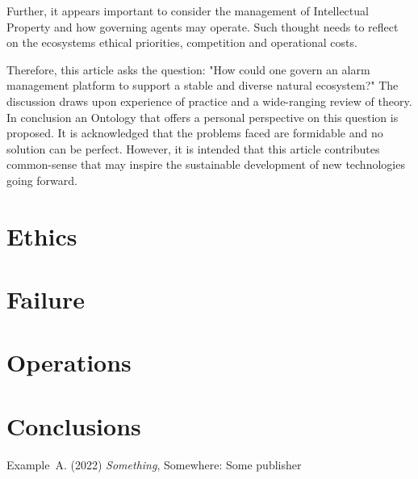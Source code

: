 \documentclass[11pt, oneside]{article}   	%
\begin{document}
Further, it appears important to consider the management of Intellectual Property and how governing agents may operate.
Such thought needs to reflect on the ecosystems ethical priorities, competition and operational costs.

Therefore, this article asks the question: "How could one govern an alarm management platform to support a stable and diverse natural ecosystem?"
The discussion draws upon experience of practice and a wide-ranging review of theory.
In conclusion an Ontology that offers a personal perspective on this question is proposed.
It is acknowledged that the problems faced are formidable and no solution can be perfect.
However, it is intended that this article contributes common-sense that may inspire the sustainable development of new technologies going forward.


\section{Ethics}


\section{Failure}


\section{Operations}


\section{Conclusions}

\begin{thebibliography}{99}

 Example~A. (2022)
\emph{Something},
Somewhere: Some publisher

\end{thebibliography}
\end{document}
